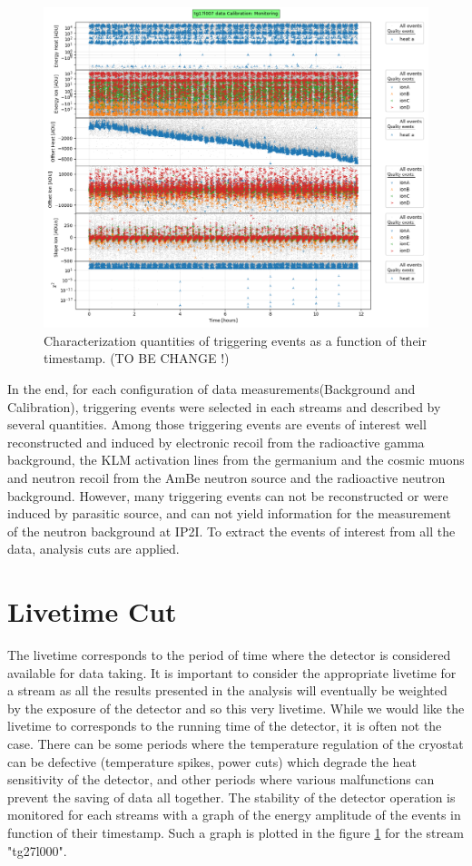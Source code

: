 \begin{figure}
\centering
\includegraphics[width=\linewidth,]{Figures/Neutron/analysis_monitoring_demo.png}
\caption{Characterization quantities of triggering events as a function of their timestamp. (TO BE CHANGE !)}
\label{fig:analysis-monitoring-demo}
\end{figure}

In the end, for each configuration of data measurements(Background and Calibration), triggering events were selected in each streams and described by several quantities.
Among those triggering events are events of interest well reconstructed and induced by electronic recoil from the radioactive gamma background, the KLM activation lines from the germanium and the cosmic muons and neutron recoil from the AmBe neutron source and the radioactive neutron background. However, many triggering events can not be reconstructed or were induced by parasitic source, and can not yield information for the measurement of the neutron background at IP2I. To extract the events of interest from all the data, analysis cuts are applied.


\section{Livetime Cut}

The livetime corresponds to the period of time where the detector is considered available for data taking.
It is important to consider the appropriate livetime for a stream as all the results presented in the analysis will eventually be weighted by the exposure of the detector and so this very livetime. While we would like the livetime to corresponds to the running time of the detector, it is often not the case. There can be some periods where the temperature regulation of the cryostat can be defective (temperature spikes, power cuts) which degrade the heat sensitivity of the detector, and other periods where various malfunctions can prevent the saving of data all together. The stability of the detector operation is monitored for each streams with a graph of the energy amplitude of the events in function of their timestamp. Such a graph is plotted in the figure \ref{fig:analysis-monitoring-demo} for the stream "tg27l000".

